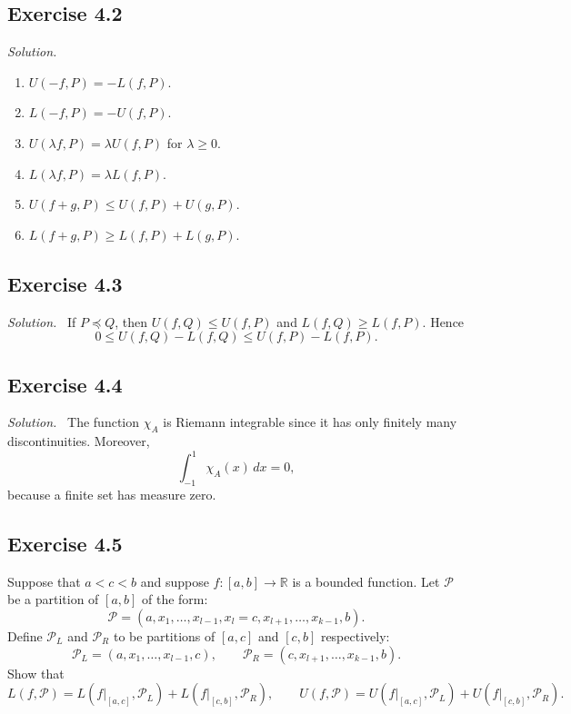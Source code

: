 \documentclass[11pt,a4paper]{article}
\newenvironment{solution}{\par\noindent\textit{Solution.}\ }{\par\vspace{0.5em}}
\begin{document}
\subsection*{Exercise 4.2}
\begin{solution}
	\begin{enumerate}[label=\alph*)]
		\item $U(-f,P) = -L(f,P)$.
		\item $L(-f,P) = -U(f,P)$.
		\item $U(\lambda f,P) = \lambda U(f,P)$ for $\lambda \geq 0$.
		\item $L(\lambda f,P) = \lambda L(f,P)$.
		\item $U(f+g,P) \leq U(f,P) + U(g,P)$.
		\item $L(f+g,P) \geq L(f,P) + L(g,P)$.
	\end{enumerate}
\end{solution}

\subsection*{Exercise 4.3}
\begin{solution}
	If $P \preceq Q$, then $U(f,Q) \leq U(f,P)$ and $L(f,Q) \geq L(f,P)$. Hence
	\[
	0 \leq U(f,Q)-L(f,Q) \leq U(f,P)-L(f,P).
	\]
\end{solution}

\subsection*{Exercise 4.4}
\begin{solution}
	The function $\chi_A$ is Riemann integrable since it has only finitely many discontinuities. Moreover,
	\[
	\int_{-1}^1 \chi_A(x)\, dx = 0,
	\]
	because a finite set has measure zero.
\end{solution}

\subsection*{Exercise 4.5}
Suppose that $a < c < b$ and suppose $f : [a,b] \to \mathbb{R}$ is a bounded function. 
Let $\mathcal{P}$ be a partition of $[a,b]$ of the form:
\[
\mathcal{P} = (a, x_1,\ldots,x_{l-1},x_l=c,x_{l+1},\ldots,x_{k-1},b).
\]
Define $\mathcal{P}_L$ and $\mathcal{P}_R$ to be partitions of $[a,c]$ and $[c,b]$ respectively:
\[
\mathcal{P}_L = (a,x_1,\ldots,x_{l-1},c), \qquad 
\mathcal{P}_R = (c,x_{l+1},\ldots,x_{k-1},b).
\]
Show that
\[
L(f,\mathcal{P}) = L(f|_{[a,c]},\mathcal{P}_L) + L(f|_{[c,b]},\mathcal{P}_R), \qquad
U(f,\mathcal{P}) = U(f|_{[a,c]},\mathcal{P}_L) + U(f|_{[c,b]},\mathcal{P}_R).
\]
\end{document}
